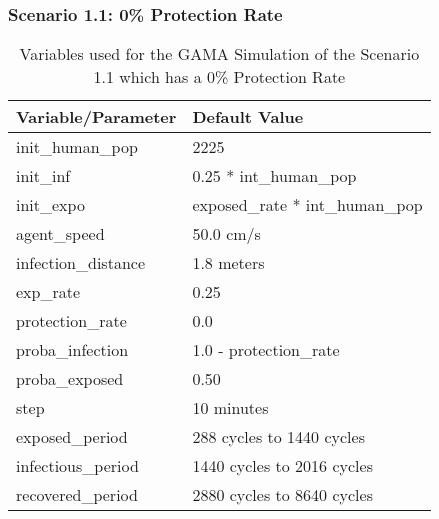 	\subsubsection{Scenario 1.1: 0\% Protection Rate}
	\begin{table}[H]
		\centering
		\begin{tabular}{ll}
			\toprule
			\textbf{Variable/}\textbf{Parameter} & \textbf{Default Value}\\
			\hline
			init\_human\_pop & 2225\\
			init\_inf & 0.25 * int\_human\_pop\\
			init\_expo & exposed\_rate * int\_human\_pop \\
			agent\_speed & 50.0 cm/s\\
			infection\_distance & 1.8 meters\\
			exp\_rate & 0.25\\
			protection\_rate & 0.0\\
			proba\_infection & 1.0 - protection\_rate\\
			proba\_exposed & 0.50\\
			step & 10 minutes\\
			exposed\_period & 288 cycles to 1440 cycles\\
			infectious\_period & 1440 cycles to 2016 cycles\\
			recovered\_period & 2880 cycles to 8640 cycles\\ 
			\bottomrule
		\end{tabular}
		\caption{Variables used for the GAMA Simulation of the Scenario 1.1 which has a 0\% Protection Rate}
		\label{1.1}
	\end{table}
	
